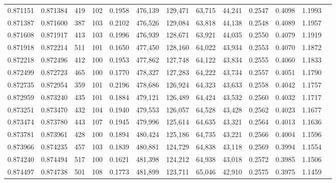 \begin{tabular}{rrrrrrrrrrrrr}
0.871151 & 0.871384 &   419 & 102 &                                     0.1958 & 476,139 & 129,471 &  63,715 &  44,241 & 0.2547 & 0.4098 & 1.1993 \\
0.871387 & 0.871600 &   387 & 103 &                                     0.2102 & 476,526 & 129,084 &  63,818 &  44,138 & 0.2548 & 0.4089 & 1.1957 \\
0.871608 & 0.871917 &   413 & 103 &                                     0.1996 & 476,939 & 128,671 &  63,921 &  44,035 & 0.2550 & 0.4079 & 1.1919 \\
0.871918 & 0.872214 &   511 & 101 &                                     0.1650 & 477,450 & 128,160 &  64,022 &  43,934 & 0.2553 & 0.4070 & 1.1872 \\
0.872218 & 0.872496 &   412 & 100 &                                     0.1953 & 477,862 & 127,748 &  64,122 &  43,834 & 0.2555 & 0.4060 & 1.1833 \\
0.872499 & 0.872723 &   465 & 100 &                                     0.1770 & 478,327 & 127,283 &  64,222 &  43,734 & 0.2557 & 0.4051 & 1.1790 \\
0.872735 & 0.872954 &   359 & 101 &                                     0.2196 & 478,686 & 126,924 &  64,323 &  43,633 & 0.2558 & 0.4042 & 1.1757 \\
0.872959 & 0.873240 &   435 & 101 &                                     0.1884 & 479,121 & 126,489 &  64,424 &  43,532 & 0.2560 & 0.4032 & 1.1717 \\
0.873251 & 0.873470 &   432 & 104 &                                     0.1940 & 479,553 & 126,057 &  64,528 &  43,428 & 0.2562 & 0.4023 & 1.1677 \\
0.873474 & 0.873780 &   443 & 107 &                                     0.1945 & 479,996 & 125,614 &  64,635 &  43,321 & 0.2564 & 0.4013 & 1.1636 \\
0.873781 & 0.873961 &   428 & 100 &                                     0.1894 & 480,424 & 125,186 &  64,735 &  43,221 & 0.2566 & 0.4004 & 1.1596 \\
0.873966 & 0.874235 &   457 & 103 &                                     0.1839 & 480,881 & 124,729 &  64,838 &  43,118 & 0.2569 & 0.3994 & 1.1554 \\
0.874240 & 0.874494 &   517 & 100 &                                     0.1621 & 481,398 & 124,212 &  64,938 &  43,018 & 0.2572 & 0.3985 & 1.1506 \\
0.874497 & 0.874738 &   501 & 108 &                                     0.1773 & 481,899 & 123,711 &  65,046 &  42,910 & 0.2575 & 0.3975 & 1.1459 \\

\end{tabular}
